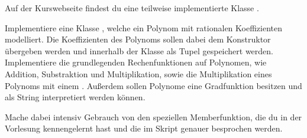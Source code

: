 \begin{aufg}
  Auf der Kurswebseite findest du eine teilweise implementierte Klasse .
  
  Implementiere eine Klasse , welche ein Polynom mit rationalen 
  Koeffizienten modelliert.
  Die Koeffizienten des Polynoms sollen dabei dem Konstruktor übergeben werden
  und innerhalb der Klasse als Tupel gespeichert werden.
  Implementiere die grundlegenden Rechenfunktionen auf Polynomen, wie 
  Addition, Substraktion und Multiplikation, sowie die Multiplikation eines 
  Polynoms mit einem .
  Außerdem sollen Polynome eine Gradfunktion besitzen und als String interpretiert werden können.

  Mache dabei intensiv Gebrauch von den speziellen Memberfunktion, die du
  in der Vorlesung kennengelernt hast und die im Skript genauer besprochen werden.
\end{aufg}
